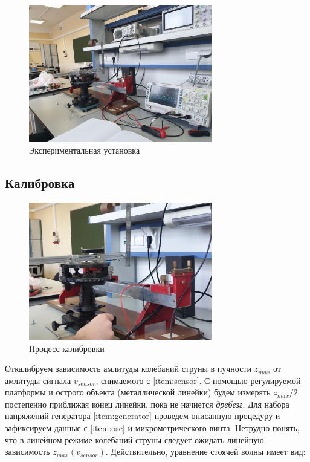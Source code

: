 \documentclass{article}
\begin{document}
\begin{figure}[h]
    \centering
    \includegraphics[width=8cm]{drawings/lab-setup.png}
    \caption{Экспериментальная установка}
    \label{fig:lab-setup}
\end{figure}

\subsection{Калибровка}

\begin{figure}[h]
    \centering
    \includegraphics[width=8cm]{drawings/tuning.jpg}
		\caption{Процесс калибровки}
    \label{fig:lab-setup}
\end{figure}


Откалибруем зависимость амлитуды колебаний струны в пучности $z_{max}$ от амлитуды сигнала $v_{sensor}$, снимаемого с \ref{item:sensor}.
С помощью регулируемой платформы и острого объекта (металлической линейки) будем измерять $z_{max}/2$ постепенно приближая
конец линейки, пока не начнется \textit{дребезг}. Для набора напряжений генератора \ref{item:generator} проведем описанную процедуру
и зафиксируем данные с \ref{item:osc} и микрометрического винта. Нетрудно понять, что в линейном режиме колебаний струны следует ожидать
линейную зависимость $z_{max}(v_{sensor})$. Действительно, уравнение стоячей волны имеет вид:
\end{document}
